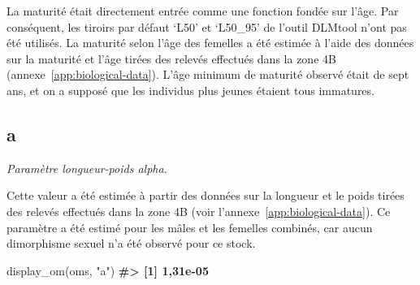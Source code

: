 \documentclass[french,11pt]{book}
\newenvironment{Shaded}{\begin{snugshade}}{\end{snugshade}}
\newcommand{\CommentTok}[1]{\textcolor[rgb]{0.56,0.35,0.01}{\textbf{#1}}}
\newcommand{\ControlFlowTok}[1]{\textcolor[rgb]{0.13,0.29,0.53}{\textit{#1}}}
\newcommand{\DecValTok}[1]{\textcolor[rgb]{0.00,0.00,0.81}{#1}}
\newcommand{\FloatTok}[1]{\textcolor[rgb]{0.00,0.00,0.81}{#1}}
\newcommand{\FunctionTok}[1]{\textcolor[rgb]{0.00,0.00,0.00}{#1}}
\newcommand{\NormalTok}[1]{#1}
\newcommand{\OtherTok}[1]{\textcolor[rgb]{0.56,0.35,0.01}{#1}}
\newcommand{\SpecialCharTok}[1]{\textcolor[rgb]{0.00,0.00,0.00}{#1}}
\newcommand{\StringTok}[1]{\textcolor[rgb]{0.31,0.60,0.02}{#1}}
\begin{document}
La maturité était directement entrée comme une fonction fondée sur l'âge. Par conséquent, les tiroirs par défaut `L50' et `L50\_95' de l'outil DLMtool n'ont pas été utilisés. La maturité selon l'âge des femelles a été estimée à l'aide des données sur la maturité et l'âge tirées des relevés effectués dans la zone 4B (annexe~\ref{app:biological-data}). L'âge minimum de maturité observé était de sept ans, et on a supposé que les individus plus jeunes étaient tous immatures.
\begin{Shaded}
\end{Shaded}
\subsection{a}
\label{app:desc-stock-a-yelloweye}

\emph{Paramètre longueur-poids alpha.}

Cette valeur a été estimée à partir des données sur la longueur et le poids tirées des relevés effectués dans la zone 4B (voir l'annexe~\ref{app:biological-data}). Ce paramètre a été estimé pour les mâles et les femelles combinés, car aucun dimorphisme sexuel n'a été observé pour ce stock.
\begin{Shaded}
\begin{Highlighting}[]
\FunctionTok{display\_om}\NormalTok{(oms, }\StringTok{"a"}\NormalTok{)}
\CommentTok{\#\textgreater{} [1] 1,31e{-}05}
\end{Highlighting}
\end{Shaded}
\end{document}
